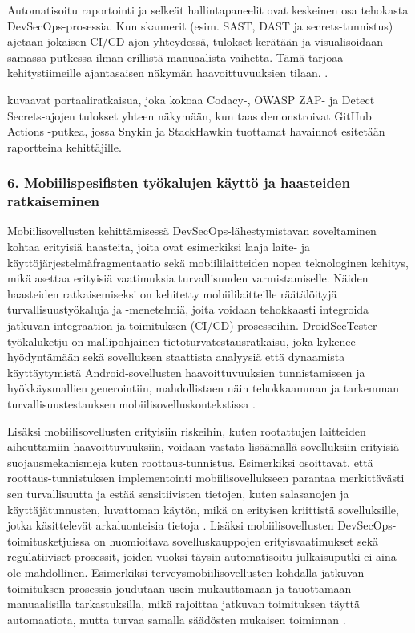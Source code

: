 \documentclass[bscthesis,finnish,oneside,biblatex]{uefcsthesis}
\begin{document}
Automatisoitu raportointi ja selkeät hallintapaneelit ovat keskeinen osa tehokasta DevSecOps-prosessia. Kun skannerit (esim. SAST, DAST ja secrets-tunnistus) ajetaan jokaisen CI/CD-ajon yhteydessä, tulokset kerätään ja visualisoidaan samassa putkessa ilman erillistä manuaalista vaihetta. Tämä tarjoaa kehitystiimeille ajantasaisen näkymän haavoittuvuuksien tilaan. \cite{marandi2023_ias,aljohani2023_automating}.

\cite{aljohani2023_automating} kuvaavat portaaliratkaisua, joka kokoaa Codacy-, OWASP ZAP- ja Detect Secrets-ajojen tulokset yhteen näkymään, kun taas \cite{marandi2023_ias} demonstroivat GitHub Actions -putkea, jossa Snykin ja StackHawkin tuottamat havainnot esitetään raportteina kehittäjille.

\subsubsection{6. Mobiilispesifisten työkalujen käyttö ja haasteiden ratkaiseminen}

Mobiilisovellusten kehittämisessä DevSecOps-lähestymistavan soveltaminen kohtaa erityisiä haasteita, joita ovat esimerkiksi laaja laite- ja käyttöjärjestelmäfragmentaatio sekä mobiililaitteiden nopea teknologinen kehitys, mikä asettaa erityisiä vaatimuksia turvallisuuden varmistamiselle. Näiden haasteiden ratkaisemiseksi on kehitetty mobiililaitteille räätälöityjä turvallisuustyökaluja ja -menetelmiä, joita voidaan tehokkaasti integroida jatkuvan integraation ja toimituksen (CI/CD) prosesseihin. DroidSecTester-työkaluketju on mallipohjainen tietoturvatestausratkaisu, joka kykenee hyödyntämään sekä sovelluksen staattista analyysiä että dynaamista käyttäytymistä Android-sovellusten haavoittuvuuksien tunnistamiseen ja hyökkäysmallien generointiin, mahdollistaen näin tehokkaamman ja tarkemman turvallisuustestauksen mobiilisovelluskontekstissa \cite{baheux2023_droidsectester}.

Lisäksi mobiilisovellusten erityisiin riskeihin, kuten rootattujen laitteiden aiheuttamiin haavoittuvuuksiin, voidaan vastata lisäämällä sovelluksiin erityisiä suojausmekanismeja kuten roottaus-tunnistus. Esimerkiksi \cite{mukti2023_passwordmanager} osoittavat, että roottaus-tunnistuksen implementointi mobiilisovellukseen parantaa merkittävästi sen turvallisuutta ja estää sensitiivisten tietojen, kuten salasanojen ja käyttäjätunnusten, luvattoman käytön, mikä on erityisen kriittistä sovelluksille, jotka käsittelevät arkaluonteisia tietoja \cite{mukti2023_passwordmanager}. Lisäksi mobiilisovellusten DevSecOps-toimitusketjuissa on huomioitava sovelluskauppojen erityisvaatimukset sekä regulatiiviset prosessit, joiden vuoksi täysin automatisoitu julkaisuputki ei aina ole mahdollinen. Esimerkiksi terveysmobiilisovellusten kohdalla jatkuvan toimituksen prosessia joudutaan usein mukauttamaan ja tauottamaan manuaalisilla tarkastuksilla, mikä rajoittaa jatkuvan toimituksen täyttä automaatiota, mutta turvaa samalla säädösten mukaisen toiminnan \cite{byman2024continuous}.
\end{document}
